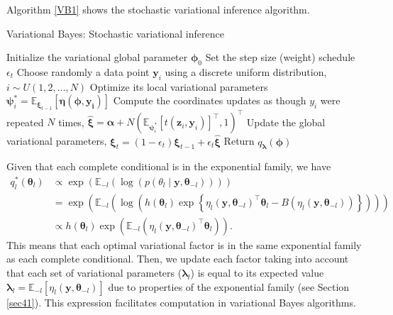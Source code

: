 Algorithm \ref{VB1} shows the stochastic variational inference algorithm. 

\begin{algorithm}
	\caption{Variational Bayes: Stochastic variational inference}\label{VB1}
	\begin{algorithmic}[1]
		\State Initialize the variational global parameter $\boldsymbol{\phi}_0$
		\State Set the step size (weight) schedule $\epsilon_t$
		\State Choose randomly a data point $\boldsymbol{y}_i$ using a discrete uniform distribution, $i\sim U(1,2,\dots,N)$
		\State Optimize its local variational parameters $\boldsymbol{\psi}_i^*=\mathbb{E}_{\boldsymbol{\xi}_{t-1}}[\boldsymbol{\eta(\boldsymbol{\phi},y_i)}]$
		\State Compute the coordinates updates as though $y_i$ were repeated $N$ times, $\hat{\boldsymbol{\xi}}=\boldsymbol{\alpha}+N(\mathbb{E}_{\boldsymbol{\psi}_i^*}[t(\boldsymbol{z}_i,\boldsymbol{y}_i)]^{\top},1)^{\top}$
		\State Update the global variational parameters, $\boldsymbol{\xi}_t=(1-\epsilon_t)\boldsymbol{\xi}_{t-1}+\epsilon_t\hat{\boldsymbol{\xi}}$  
		\EndWhile 
		\State Return $q_{\boldsymbol{\lambda}}(\boldsymbol{\phi})$ 
	\end{algorithmic}
\end{algorithm} 

Given that each complete conditional is in the exponential family, we have 
\begin{align*}
	q_l^*(\boldsymbol{\theta}_l)&\propto \exp\left(\mathbb{E}_{-l}(\log\left(p({\theta}_{l}\mid\boldsymbol{y},\boldsymbol\theta_{-l})\right))\right)\\
	&=\exp\left(\mathbb{E}_{-l}(\log\left(h(\boldsymbol{\theta}_l)\exp\left\{\eta_l(\boldsymbol{y},\boldsymbol\theta_{-l})^{\top}\boldsymbol{\theta}_l-B(\eta_l(\boldsymbol{y},\boldsymbol\theta_{-l}))\right\}\right))\right)\\
	&\propto h(\boldsymbol{\theta}_l) \exp\left(\mathbb{E}_{-l}(\eta_l(\boldsymbol{y},\boldsymbol\theta_{-l})^{\top}\boldsymbol{\theta}_l)\right).
\end{align*}
This means that each optimal variational factor is in the same exponential family as each complete conditional. Then, we update each factor taking into account that each set of variational parameters ($\boldsymbol{\lambda}_l$) is equal to its expected value $\boldsymbol{\lambda}_l=\mathbb{E}_{-l}[\eta_l(\boldsymbol{y},\boldsymbol\theta_{-l})]$ due to properties of the exponential family (see Section \ref{sec41}). This expression facilitates computation in variational Bayes algorithms.

